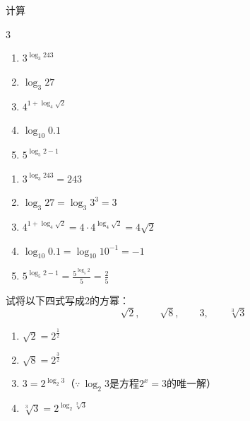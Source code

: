 \begin{example}
计算
\begin{multicols}{3}
\begin{enumerate}
    \item $3^{\log_3 243}$
    \item $\log_3 27$
    \item $4^{1+\log_4\sqrt{2}}$
    \item $\log_{10}0.1$
    \item $5^{\log_5 2 -1}$
\end{enumerate}
\end{multicols}
\end{example}

\begin{solution}
\begin{enumerate}
    \item $3^{\log_3 243}=243$
    \item $\log_3 27=\log_3 3^3=3$
    \item $4^{1+\log_4\sqrt{2}}=4\cdot 4^{\log_4\sqrt{2}}=4\sqrt{2}$
    \item $\log_{10}0.1=\log_{10}10^{-1}=-1$
    \item $5^{\log_5 2 -1}=\frac{5^{\log_5 2}}{5}=\frac{2}{5}$
\end{enumerate}    
\end{solution}

\begin{example}
 试将以下四式写成2的方幂：
 \[\sqrt{2},\qquad \sqrt{8},\qquad 3,\qquad \sqrt[3]{3}\]   
\end{example}
  
\begin{solution}
\begin{enumerate}
    \item $\sqrt{2}=2^{\tfrac{1}{2}}$
    \item $\sqrt{8}=2^{\tfrac{3}{2}}$
    \item $3=2^{\log_2 3}$（$\because\ \log_2 3$是方程$2^x=3$的唯一解）
    \item $\sqrt[3]{3}=2^{\log_2 \sqrt[3]{3}}$
\end{enumerate}
\end{solution} 


